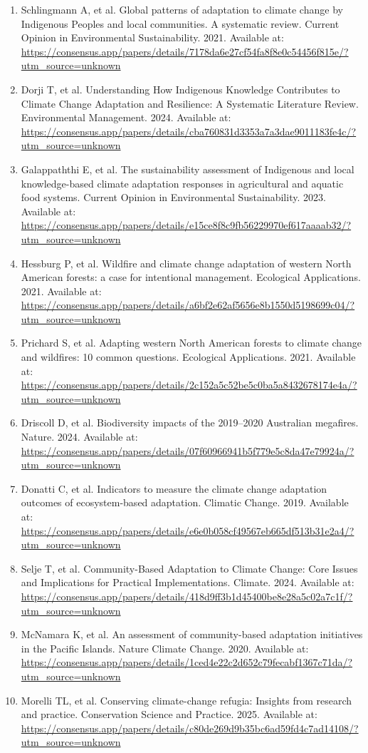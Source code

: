 \documentclass[11pt]{article}
\begin{document}
\begin{enumerate}
\item Schlingmann A, et al. Global patterns of adaptation to climate change by Indigenous Peoples and local communities. A systematic review. Current Opinion in Environmental Sustainability. 2021. Available at: \url{https://consensus.app/papers/details/7178da6e27cf54fa8f8e0c54456f815e/?utm_source=unknown}
\item Dorji T, et al. Understanding How Indigenous Knowledge Contributes to Climate Change Adaptation and Resilience: A Systematic Literature Review. Environmental Management. 2024. Available at: \url{https://consensus.app/papers/details/cba760831d3353a7a3dae9011183fe4c/?utm_source=unknown}
\item Galappaththi E, et al. The sustainability assessment of Indigenous and local knowledge-based climate adaptation responses in agricultural and aquatic food systems. Current Opinion in Environmental Sustainability. 2023. Available at: \url{https://consensus.app/papers/details/e15ce8f8c9fb56229970ef617aaaab32/?utm_source=unknown}
\item Hessburg P, et al. Wildfire and climate change adaptation of western North American forests: a case for intentional management. Ecological Applications. 2021. Available at: \url{https://consensus.app/papers/details/a6bf2e62af5656e8b1550d5198699c04/?utm_source=unknown}
\item Prichard S, et al. Adapting western North American forests to climate change and wildfires: 10 common questions. Ecological Applications. 2021. Available at: \url{https://consensus.app/papers/details/2c152a5c52be5c0ba5a8432678174e4a/?utm_source=unknown}
\item Driscoll D, et al. Biodiversity impacts of the 2019--2020 Australian megafires. Nature. 2024. Available at: \url{https://consensus.app/papers/details/07f60966941b5f779e5c8da47e79924a/?utm_source=unknown}
\item Donatti C, et al. Indicators to measure the climate change adaptation outcomes of ecosystem-based adaptation. Climatic Change. 2019. Available at: \url{https://consensus.app/papers/details/e6e0b058cf49567eb665df513b31e2a4/?utm_source=unknown}
\item Selje T, et al. Community-Based Adaptation to Climate Change: Core Issues and Implications for Practical Implementations. Climate. 2024. Available at: \url{https://consensus.app/papers/details/418d9ff3b1d45400be8e28a5c02a7c1f/?utm_source=unknown}
\item McNamara K, et al. An assessment of community-based adaptation initiatives in the Pacific Islands. Nature Climate Change. 2020. Available at: \url{https://consensus.app/papers/details/1ced4e22c2d652c79fecabf1367c71da/?utm_source=unknown}
\item Morelli TL, et al. Conserving climate-change refugia: Insights from research and practice. Conservation Science and Practice. 2025. Available at: \url{https://consensus.app/papers/details/c80de269d9b35bc6ad59fd4c7ad14108/?utm_source=unknown}
\end{enumerate}
\end{document}
